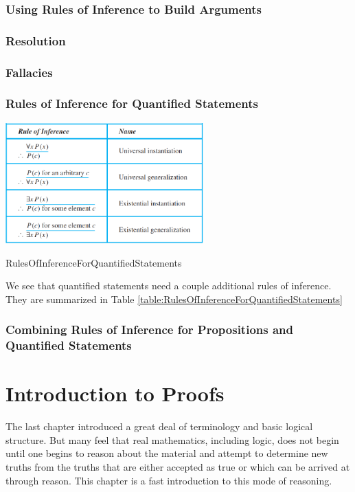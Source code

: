 \documentclass[11pt]{book} %
\theoremstyle {definition}
\theoremstyle {remark}
\begin{document}
   \subsection {Using Rules of Inference to Build Arguments}
   \subsection {Resolution}
   \subsection {Fallacies}
   \subsection {Rules of Inference for Quantified Statements}
   
  \begin{table}[htbp]
  \includegraphics [width=3in]
  {Table-1-6-2-RulesOfInferenceForQuantifiedStatements}
  \caption{RulesOfInferenceForQuantifiedStatements}
  \label{table:RulesOfInferenceForQuantifiedStatements}
  \end{table}
  
  We see that quantified statements need a couple additional rules of inference. They are summarized in Table \ref{table:RulesOfInferenceForQuantifiedStatements}
   
   \subsection {Combining Rules of Inference for Propositions and Quantified Statements}
 
 






\chapter{Introduction to Proofs}
The last chapter introduced a great deal of terminology and basic logical structure. But many feel that real mathematics, including logic, does not begin until one begins to reason about the material and attempt to determine new truths from the truths that are either accepted as true or which can be arrived at through reason. This chapter is a fast introduction to this mode of reasoning.
\end{document}
